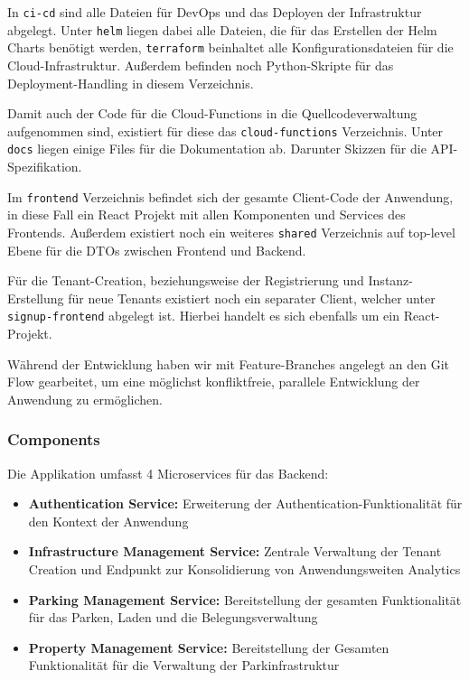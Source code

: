 In \verb|ci-cd| sind alle Dateien für DevOps und das Deployen der Infrastruktur abgelegt. Unter \verb|helm| liegen dabei alle Dateien, die für das Erstellen der Helm Charts benötigt werden, \verb|terraform| beinhaltet alle Konfigurationsdateien für die Cloud-Infrastruktur. Außerdem befinden noch Python-Skripte für das Deployment-Handling in diesem Verzeichnis.

Damit auch der Code für die Cloud-Functions in die Quellcodeverwaltung aufgenommen sind, existiert für diese das \verb|cloud-functions| Verzeichnis.
Unter \verb|docs| liegen einige Files für die Dokumentation ab. Darunter Skizzen für die API-Spezifikation.

Im \verb|frontend| Verzeichnis befindet sich der gesamte Client-Code der Anwendung, in diese Fall ein React Projekt mit allen Komponenten und Services des Frontends.
Außerdem existiert noch ein weiteres \verb|shared| Verzeichnis auf top-level Ebene für die DTOs zwischen Frontend und Backend.

Für die Tenant-Creation, beziehungsweise der Registrierung und Instanz-Erstellung für neue Tenants existiert noch ein separater Client, welcher unter \verb|signup-frontend| abgelegt ist. Hierbei handelt es sich ebenfalls um ein React-Projekt.

Während der Entwicklung haben wir mit Feature-Branches angelegt an den Git Flow gearbeitet, um eine möglichst konfliktfreie, parallele Entwicklung der Anwendung zu ermöglichen.

\subsubsection{Components}
Die Applikation umfasst 4 Microservices für das Backend:


\begin{itemize}
    \item \textbf{Authentication Service:} Erweiterung der Authentication-Funktionalität für den Kontext der Anwendung
    \item \textbf{Infrastructure Management Service:} Zentrale Verwaltung der Tenant Creation und Endpunkt zur Konsolidierung von Anwendungsweiten Analytics
    \item \textbf{Parking Management Service:} Bereitstellung der gesamten Funktionalität für das Parken, Laden und die Belegungsverwaltung
    \item \textbf{Property Management Service:} Bereitstellung der Gesamten Funktionalität für die Verwaltung der Parkinfrastruktur
\end{itemize}

